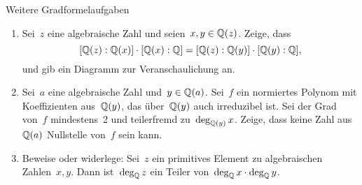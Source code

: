 \documentclass{algblatt}
\begin{document}
\vspace*{-1.5cm}


\begin{aufgabe}{Weitere Gradformelaufgaben}
\begin{enumerate}
\item Sei~$z$ eine algebraische Zahl und seien~$x, y \in \mathbb{Q}(z)$. Zeige, dass
\[ [\mathbb{Q}(z):\mathbb{Q}(x)] \cdot [\mathbb{Q}(x):\mathbb{Q}] = [\mathbb{Q}(z):\mathbb{Q}(y)] \cdot
[\mathbb{Q}(y):\mathbb{Q}], \]
und gib ein Diagramm zur Veranschaulichung an.
\item Sei~$a$ eine algebraische Zahl und~$y \in \mathbb{Q}(a)$. Sei~$f$ ein normiertes
Polynom mit Koeffizienten aus~$\mathbb{Q}(y)$, das über~$\mathbb{Q}(y)$
auch irreduzibel ist. Sei der Grad von~$f$ mindestens~2 und teilerfremd
zu~$\deg_{\mathbb{Q}(y)} x$. Zeige, dass keine Zahl aus~$\mathbb{Q}(a)$ Nullstelle von~$f$
sein kann.

\item Beweise oder widerlege: Sei~$z$ ein primitives Element zu algebraischen
Zahlen~$x, y$. Dann ist~$\deg_{\mathbb{Q}} z$ ein Teiler von~$\deg_{\mathbb{Q}} x \cdot \deg_{\mathbb{Q}}
y$.
\end{enumerate}
\end{aufgabe}
\end{document}
